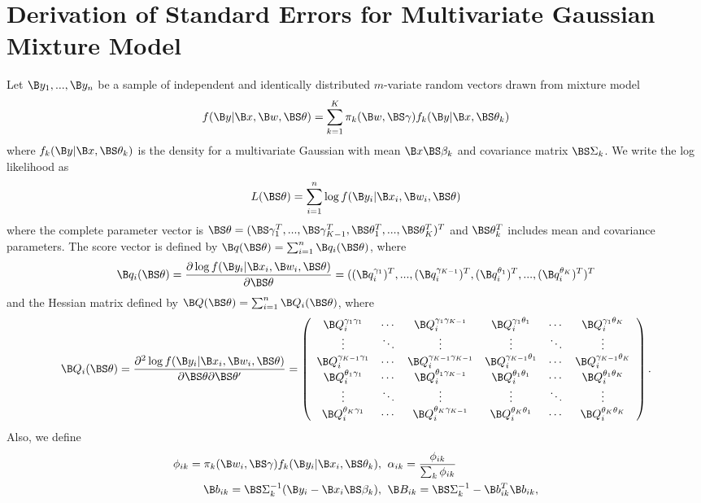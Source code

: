 \chapter{Derivation of Standard Errors for Multivariate Gaussian Mixture Model}

Let $\B y_{1},...,\B y_{n}$ be a sample of independent and identically distributed  $m$-variate random vectors drawn from mixture model
$$f(\B y|\B x, \B w, \BS\theta) = \sum^{K}_{k=1}\pi_{k}(\B w, \BS\gamma)f_{k}(\B y|\B x, \BS \theta_{k})$$
where $f_{k}(\B y|\B x, \BS \theta_{k})$ is the density for a multivariate Gaussian with mean $\B x\BS\beta_{k}$ and covariance matrix $\BS\Sigma_{k}$. We write the log likelihood as
$$L(\BS\theta)=\sum^{n}_{i=1}\log f(\B y_{i}|\B x_{i},\B w_{i},\BS\theta)$$
where the complete parameter vector is $\BS\theta=(\BS\gamma_{1}^{T},...,\BS\gamma_{K-1}^{T},\BS\theta^{T}_{1},...,\BS\theta^{T}_{K})^{T}$ and $\BS\theta_{k}^{T}$ includes mean and covariance parameters. The score vector is defined by $\B q(\BS\theta)=\sum_{i=1}^{n}\B q_{i}(\BS \theta)$, where
$$\B q_{i}(\BS\theta)=\frac{\partial \log f(\B y_{i}|\B x_{i},\B w_{i},\BS\theta)}{\partial \BS\theta}=((\B q^{\gamma_{1}}_{i})^{T},...,(\B q^{\gamma_{K-1}}_{i})^{T},(\B q^{\theta_{1}}_{i})^{T},...,(\B q^{\theta_{K}}_{i})^{T})^{T}$$
and the Hessian matrix defined by $\B Q(\BS\theta)=\sum_{i=1}^{n}\B Q_{i}(\BS\theta)$, where
$$ \B Q_{i}(\BS\theta)=\frac{\partial^{2} \log f(\B y_{i}|\B x_{i},\B w_{i},\BS\theta)}{\partial \BS\theta\partial \BS\theta'}=\left(\begin{array}{cccccc} \B Q^{\gamma_{1}\gamma_{1}}_{i}&\cdots&\B Q^{\gamma_{1}\gamma_{K-1}}_{i}&\B Q^{\gamma_{1}\theta_{1}}_{i}&\cdots&\B Q^{\gamma_{1}\theta_{K}}_{i}\\
\vdots&\ddots&\vdots&\vdots&\ddots&\vdots\\
\B Q^{\gamma_{K-1}\gamma_{1}}_{i}&\cdots&\B Q^{\gamma_{K-1}\gamma_{K-1}}_{i}&\B Q^{\gamma_{K-1}\theta_{1}}_{i}&\cdots&\B Q^{\gamma_{K-1}\theta_{K}}_{i}\\
\B Q^{\theta_{1}\gamma_{1}}_{i}&\cdots&\B Q^{\theta_{1}\gamma_{K-1}}_{i}&\B Q^{\theta_{1}\theta_{1}}_{i}&\cdots&\B Q^{\theta_{1}\theta_{K}}_{i}\\
\vdots&\ddots&\vdots&\vdots&\ddots&\vdots\\
\B Q^{\theta_{K}\gamma_{1}}_{i}&\cdots&\B Q^{\theta_{K}\gamma_{K-1}}_{i}&\B Q^{\theta_{K}\theta_{1}}_{i}&\cdots&\B Q^{\theta_{K}\theta_{K}}_{i}\\
\end{array} \right).$$
Also, we define
\begin{align}
\phi_{ik}=\pi_{k}(\B w_{i},\BS\gamma)f_{k}(\B y_{i}|\B x_{i},\BS\theta_{k}),&\;\; \alpha_{ik}=\frac{\phi_{ik}}{\sum_{k}\phi_{ik}}\label{phi}\\
\B b_{ik}=\BS\Sigma_{k}^{-1}(\B y_{i}-\B x_{i}\BS\beta_{k}),&\;\; \B B_{ik}=\BS\Sigma_{k}^{-1}-\B b^{T}_{ik}\B b_{ik},\label{bs2}
\end{align}

